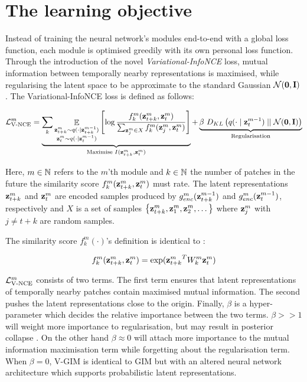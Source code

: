 	
		
\section{The learning objective} \label{cha:vgim_learning_objective}
	Instead of training the neural network's modules end-to-end with a global loss function, each module is optimised greedily with its own personal loss function. Through the introduction of the novel \textit{Variational-InfoNCE} loss, mutual information between temporally nearby representations is maximised, while regularising the latent space to be approximate to the standard Gaussian $\mathcal{N}(\bm{\mathbf{0}}, \mathbf{I})$. The Variational-InfoNCE loss is defined as follows:
	
	\begin{equation} %
		\Lvnce^m =
		\underbrace{\reconstrgim}_{\text{Maximise } I(\ztk^m, \zt^m)} + \underbrace{\beta ~ \latentspaceconstraintgim}_{\text{Regularisation}}
		\label{eq:variational_gim_loss}
	\end{equation}

	Here, $m \in \mathbb{N}$ refers to the $m$'th module and $k \in \mathbb{N}$ the number of patches in the future the similarity score $f_k^m(\mathbf{z}_{t+k}^m,\mathbf{z}_t^m)$ must rate. The latent representations $\mathbf{z}_{t+k}^m$ and $\mathbf{z}_t^m$ are encoded samples produced by $g_{enc}^m(\mathbf{z}_{t+k}^{m-1})$ and $g_{enc}^m(\mathbf{z}_t^{m-1})$, respectively and $X$ is a set of samples ${ \left\{ \mathbf{z}_{t+k}^m, \mathbf{z}_1^m, \mathbf{z}_2^m, \dots \right\} }$ where $\mathbf{z}_j^m$ with $j \neq t \! + \! k$ are random samples.


	The similarity score $f_k^m(\cdot)$'s definition is identical to \cite{lowePuttingEndEndtoEnd2020}:
	
	$$ f_k^m(\mathbf{z}_{t+k}^m,\mathbf{z}_t^m) = \exp({\mathbf{z}_{t+k}^m}^TW_k^m\mathbf{z}_t^m) $$
	
	
	$\mathcal{L}_{\text{V-NCE}}^m$ consists of two terms. The first term ensures that latent representations of temporally nearby patches contain maximised mutual information. The second pushes the latent representations close to the origin. Finally, $\beta$ is a hyper-parameter which decides the relative importance between the two terms. $\beta >> 1$ will weight more importance to regularisation, but may result in posterior collapse \cite{lucasUnderstandingPosteriorCollapse2022}. On the other hand $\beta \approx 0$ will attach more importance to the mutual information maximisation term while forgetting about the regularisation term. When $\beta = 0$, V-GIM is identical to GIM but with an altered neural network architecture which supports probabilistic latent representations.
	
